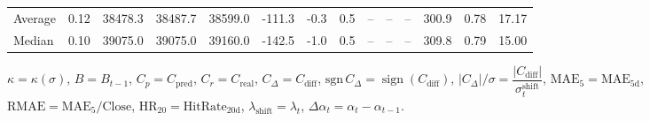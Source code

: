 \begin{threeparttable}
{\begin{tabular}{lrrrrrrrrrrrrr}
Average &     0.12 & 38478.3 & 38487.7 & 38599.0 &     -111.3 &                     -0.3 &                 0.5 &         -- &        -- &             -- &            300.9 &            0.78 &                  17.17 \\
 Median &     0.10 & 39075.0 & 39075.0 & 39160.0 &     -142.5 &                     -1.0 &                 0.5 &         -- &        -- &             -- &            309.8 &            0.79 &                  15.00 \\
\bottomrule
\end{tabular}
}
\begin{tablenotes}\footnotesize
\item $\kappa=\kappa(\sigma)$, $B=B_{t-1}$, $C_p=C_{\text{pred}}$, $C_r=C_{\text{real}}$, $C_\Delta=C_{\text{diff}}$, $\mathrm{sgn}\,C_\Delta=\operatorname{sign}(C_{\text{diff}})$, $|C_\Delta|/\sigma=\dfrac{|C_{\text{diff}}|}{\sigma_t^{\text{shift}}}$, $\mathrm{MAE}_5=\mathrm{MAE}_{5\text{d}}$, $\mathrm{RMAE}= \mathrm{MAE}_5 / \text{Close}$, $\mathrm{HR}_{20}=\mathrm{HitRate}_{20\text{d}}$, 
$\lambda_{\text{shift}}=\lambda_t$, 
$\Delta\alpha_t=\alpha_t-\alpha_{t-1}$.
\end{tablenotes}
\end{threeparttable}
\endgroup

